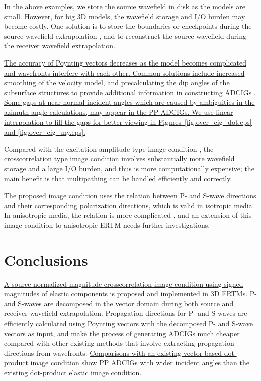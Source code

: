 \documentclass[manuscript,ulem,graphix,revised]{geophysics}
\begin{document}
In the above examples, we store the source wavefield in disk as the models are small. However, for big 3D models, the wavefield storage and I/O burden may become costly. One solution is to store the boundaries or checkpoints during the source wavefield extrapolation \citep{bao15}, and to reconstruct the source wavefield during the receiver wavefield extrapolation.

\uline{The accuracy of Poynting vectors decreases as the model becomes complicated and wavefronts interfere with each other. Common solutions include increased smoothing of the velocity model, and precalculating the dip angles of the subsurface structures to provide additional information in constructing ADCIGs \mbox{\citep{zhang11}}. Some gaps at near-normal incident angles which are caused by ambiguities in the azimuth angle calculations, may appear in the PP ADCIGs. We use linear interpolation to fill the gaps for better viewing in Figures~\ref{fig:over_cig_dot.eps} and \ref{fig:over_cig_my.eps}. }

Compared with the excitation amplitude type image condition \citep{wenlong_vct15,wenlong_3d16}, the crosscorrelation type image condition involves substantially more wavefield storage and a large I/O burden, and thus is more computationally expensive; the main benefit is that multipathing can be handled efficiently and correctly.

The proposed image condition uses the relation between P- and S-wave directions and their corresponding polarization directions, which is valid in isotropic media. In anisotropic media, the relation is more complicated \citep{wang_cl16}, and an extension of this image condition to anisotropic ERTM needs further investigations.


\section{Conclusions}

\uline{A source-normalized \marginpar{[1,12]} magnitude-crosscorrelation image condition using signed magnitudes of elastic components is proposed and implemented in 3D ERTMs.} P- and S-waves are decomposed in the vector domain during both source and receiver wavefield extrapolation. Propagation directions for P- and S-waves are efficiently calculated using Poynting vectors with the decomposed P- and S-wave vectors as input, and make the process of generating ADCIGs much cheaper compared with other existing methods that involve extracting propagation directions from wavefronts. \marginpar{[1,12]}\uline{Comparisons with an existing vector-based dot-product image condition show PP ADCIGs with wider incident angles than the existing dot-product elastic image condition.}
\end{document}
